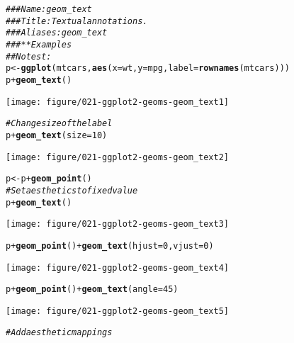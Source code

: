 \documentclass[a4paper,titlepage]{tufte-handout}\usepackage[]{graphicx}\usepackage[]{color}
\makeatletter
\def\maxwidth{ %
  \ifdim\Gin@nat@width>\linewidth
    \linewidth
  \else
    \Gin@nat@width
  \fi
}
\newcommand{\hlnum}[1]{\textcolor[rgb]{0.686,0.059,0.569}{#1}}%
\newcommand{\hlcom}[1]{\textcolor[rgb]{0.678,0.584,0.686}{\textit{#1}}}%
\newcommand{\hlopt}[1]{\textcolor[rgb]{0,0,0}{#1}}%
\newcommand{\hlstd}[1]{\textcolor[rgb]{0.345,0.345,0.345}{#1}}%
\newcommand{\hlkwb}[1]{\textcolor[rgb]{0.69,0.353,0.396}{#1}}%
\newcommand{\hlkwc}[1]{\textcolor[rgb]{0.333,0.667,0.333}{#1}}%
\newcommand{\hlkwd}[1]{\textcolor[rgb]{0.737,0.353,0.396}{\textbf{#1}}}%
\newenvironment{kframe}{%
 \def\at@end@of@kframe{}%
 \ifinner\ifhmode%
  \def\at@end@of@kframe{\end{minipage}}%
  \begin{minipage}{\columnwidth}%
 \fi\fi%
 \def\FrameCommand##1{\hskip\@totalleftmargin \hskip-\fboxsep
 \colorbox{shadecolor}{##1}\hskip-\fboxsep
     \hskip-\linewidth \hskip-\@totalleftmargin \hskip\columnwidth}%
 \MakeFramed {\advance\hsize-\width
   \@totalleftmargin\z@ \linewidth\hsize
   \@setminipage}}%
 {\par\unskip\endMakeFramed%
 \at@end@of@kframe}
\newenvironment{knitrout}{}{} %
\makeatother
\begin{document}
\begin{knitrout}
\color{fgcolor}\begin{kframe}
\begin{alltt}
\hlcom{### Name: geom_text}
\hlcom{### Title: Textual annotations.}
\hlcom{### Aliases: geom_text}
\hlcom{### ** Examples}
\hlcom{## No test: }
\hlstd{p} \hlkwb{<-} \hlkwd{ggplot}\hlstd{(mtcars,} \hlkwd{aes}\hlstd{(}\hlkwc{x}\hlstd{=wt,} \hlkwc{y}\hlstd{=mpg,} \hlkwc{label}\hlstd{=}\hlkwd{rownames}\hlstd{(mtcars)))}
\hlstd{p} \hlopt{+} \hlkwd{geom_text}\hlstd{()}
\end{alltt}
\end{kframe}
\texttt{[image: figure/021-ggplot2-geoms-geom\_text1]} 
\begin{kframe}\begin{alltt}
\hlcom{# Change size of the label}
\hlstd{p} \hlopt{+} \hlkwd{geom_text}\hlstd{(}\hlkwc{size}\hlstd{=}\hlnum{10}\hlstd{)}
\end{alltt}
\end{kframe}
\texttt{[image: figure/021-ggplot2-geoms-geom\_text2]} 
\begin{kframe}\begin{alltt}
\hlstd{p} \hlkwb{<-} \hlstd{p} \hlopt{+} \hlkwd{geom_point}\hlstd{()}
\hlcom{# Set aesthetics to fixed value}
\hlstd{p} \hlopt{+} \hlkwd{geom_text}\hlstd{()}
\end{alltt}
\end{kframe}
\texttt{[image: figure/021-ggplot2-geoms-geom\_text3]} 
\begin{kframe}\begin{alltt}
\hlstd{p} \hlopt{+} \hlkwd{geom_point}\hlstd{()} \hlopt{+} \hlkwd{geom_text}\hlstd{(}\hlkwc{hjust}\hlstd{=}\hlnum{0}\hlstd{,} \hlkwc{vjust}\hlstd{=}\hlnum{0}\hlstd{)}
\end{alltt}
\end{kframe}
\texttt{[image: figure/021-ggplot2-geoms-geom\_text4]} 
\begin{kframe}\begin{alltt}
\hlstd{p} \hlopt{+} \hlkwd{geom_point}\hlstd{()} \hlopt{+} \hlkwd{geom_text}\hlstd{(}\hlkwc{angle} \hlstd{=} \hlnum{45}\hlstd{)}
\end{alltt}
\end{kframe}
\texttt{[image: figure/021-ggplot2-geoms-geom\_text5]} 
\begin{kframe}\begin{alltt}
\hlcom{# Add aesthetic mappings}

\end{alltt}
\end{kframe}
\end{knitrout}
\end{document}
